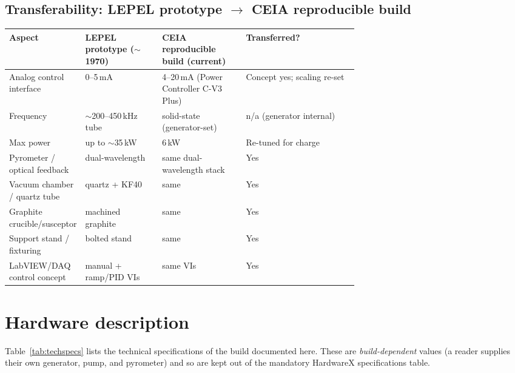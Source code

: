 \documentclass[5p,times]{elsarticle}
\begin{document}
\subsection{Transferability: LEPEL prototype $\rightarrow$ CEIA reproducible build}

\begin{table}[ht]
\small
\begin{tabularx}{\linewidth}{L{0.21\linewidth} L{0.22\linewidth} L{0.24\linewidth} X}
\toprule
\textbf{Aspect} & \textbf{LEPEL prototype ($\sim$1970)} & \textbf{CEIA reproducible build (current)} & \textbf{Transferred?} \\
\midrule
Analog control interface & 0--5\,mA & 4--20\,mA (Power Controller C-V3 Plus) & Concept yes; scaling re-set \\
Frequency & $\sim$200--450\,kHz tube & solid-state (generator-set) & n/a (generator internal) \\
Max power & up to $\sim$35\,kW & 6\,kW & Re-tuned for charge \\
Pyrometer / optical feedback & dual-wavelength & same dual-wavelength stack & Yes \\
Vacuum chamber / quartz tube & quartz + KF40 & same & Yes \\
Graphite crucible/susceptor & machined graphite & same & Yes \\
Support stand / fixturing & bolted stand & same & Yes \\
LabVIEW/DAQ control concept & manual + ramp/PID VIs & same VIs & Yes \\
\bottomrule
\end{tabularx}
\end{table}

\section{Hardware description}

Table~\ref{tab:techspecs} lists the technical specifications of the build documented
here. These are \emph{build-dependent} values (a reader supplies their own generator,
pump, and pyrometer) and so are kept out of the mandatory HardwareX specifications
table.
\end{document}
